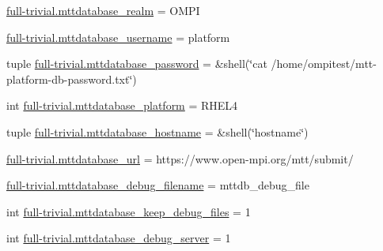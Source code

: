 \begin{DoxyCompactItemize}
$$\item 
\hyperlink{namespacefull-trivial_a5f93117c210f5de7bd0b75c05ca93072}{full-\/trivial.\-mttdatabase\-\_\-realm} = O\-M\-P\-I
\item 
\hyperlink{namespacefull-trivial_a2556ba8e56d9edb19b2a7dcff147fd83}{full-\/trivial.\-mttdatabase\-\_\-username} = platform
\item 
tuple \hyperlink{namespacefull-trivial_a00ca0a7632b4a85ca5df552bc984a77d}{full-\/trivial.\-mttdatabase\-\_\-password} = \&shell(\char`\"{}cat /home/ompitest/mtt-\/platform-\/db-\/password.\-txt\char`\"{})
\item 
int \hyperlink{namespacefull-trivial_a7435f3a6cf574a375aa8cb9b7b2fe162}{full-\/trivial.\-mttdatabase\-\_\-platform} = R\-H\-E\-L4
\item 
tuple \hyperlink{namespacefull-trivial_a774cf7cf721e8c1716122a628a72e4f8}{full-\/trivial.\-mttdatabase\-\_\-hostname} = \&shell(\char`\"{}hostname\char`\"{})
\item 
\hyperlink{namespacefull-trivial_a1e6b981d941fc6b728d6faae8632e225}{full-\/trivial.\-mttdatabase\-\_\-url} = https\-://www.\-open-\/mpi.\-org/mtt/submit/
\item 
\hyperlink{namespacefull-trivial_a5a952dcadcccb56251a2745399a467c5}{full-\/trivial.\-mttdatabase\-\_\-debug\-\_\-filename} = mttdb\-\_\-debug\-\_\-file
\item 
int \hyperlink{namespacefull-trivial_ad2a2564c1ae95fb67eda20314bac44f5}{full-\/trivial.\-mttdatabase\-\_\-keep\-\_\-debug\-\_\-files} = 1
\item 
int \hyperlink{namespacefull-trivial_a6ed803b39509a0e919f4f11063cb5209}{full-\/trivial.\-mttdatabase\-\_\-debug\-\_\-server} = 1
\end{DoxyCompactItemize}
